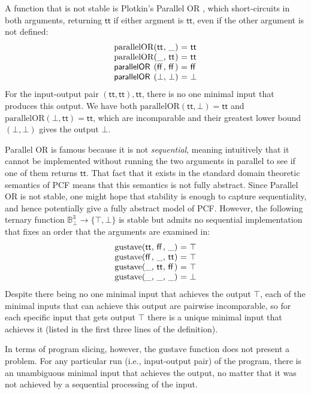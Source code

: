 \begin{example}
  A function that is not stable is Plotkin's Parallel OR \cite{lcf77},
  which short-circuits in both arguments, returning $\mathsf{tt}$ if
  either argment is $\mathsf{tt}$, even if the other argument is not
  defined:
  \begin{displaymath}
    \begin{array}{l@{(}l@{,~}l@{)~}c@{~}l}
      \mathrm{parallelOR}&\mathsf{tt}&\_&=&\mathsf{tt} \\
      \mathrm{parallelOR}&\_&\mathsf{tt}&=&\mathsf{tt} \\
      \mathsf{parallelOR}&\mathsf{ff}&\mathsf{ff}&=&\mathsf{ff} \\
      \mathsf{parallelOR}&\bot&\bot&=&\bot
    \end{array}
  \end{displaymath}
  For the input-output pair $(\mathsf{tt},\mathsf{tt}),\mathsf{tt}$,
  there is no one minimal input that produces this output. We have
  both $\mathrm{parallelOR}(\mathsf{tt},\bot) = \mathsf{tt}$ and
  $\mathrm{parallelOR}(\bot,\mathsf{tt}) = \mathsf{tt}$, which are
  incomparable and their greatest lower bound $(\bot,\bot)$ gives the
  output $\bot$.

  Parallel OR is famous because it is not \emph{sequential}, meaning
  intuitively that it cannot be implemented without running the two
  arguments in parallel to see if one of them returns
  $\mathsf{tt}$. That fact that it exists in the standard domain
  theoretic semantics of PCF means that this semantics is not fully
  abstract. Since Parallel OR is not stable, one might hope that
  stability is enough to capture sequentiality, and hence potentially
  give a fully abstract model of PCF. However, the following ternary
  function $\mathbb{B}_\bot^3 \to \{\top,\bot\}$ is stable but admits
  no sequential implementation that fixes an order that the arguments
  are examined in:
  \begin{displaymath}
    \begin{array}{l@{(}l@{,~}l@{,~}l@{)~}c@{~}l}
      \mathrm{gustave}&\mathsf{tt}&\mathsf{ff}&\_&=&\top \\
      \mathrm{gustave}&\mathsf{ff}&\_&\mathsf{tt}&=&\top \\
      \mathrm{gustave}&\_&\mathsf{tt}&\mathsf{ff}&=&\top \\
      \mathrm{gustave}&\_&\_&\_&=&\bot
    \end{array}
  \end{displaymath}
  Despite there being no one minimal input that achieves the output
  $\top$, each of the minimal inputs that can achieve this output are
  pairwise incomparable, so for each specific input that gets output
  $\top$ there is a unique minimal input that achieves it (listed in
  the first three lines of the definition).

  In terms of program slicing, however, the $\mathrm{gustave}$
  function does not present a problem. For any particular run (i.e.,
  input-output pair) of the program, there is an unambiguous minimal
  input that achieves the output, no matter that it was not achieved
  by a sequential processing of the input.
\end{example}

